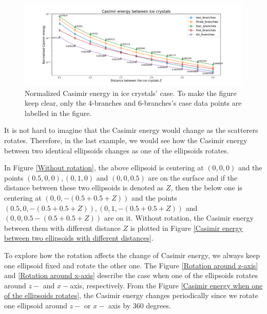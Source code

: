     \begin{figure}[H]
        \centering
        \hspace*{-1cm}\includegraphics[scale = 0.5]{figures/CasE_ice_crystals.pdf}
        \caption{Normalized Casimir energy in ice crystals' case. To make the figure keep clear, only the 4-branches and 6-branches's case data points 
        are labelled in the figure.}
        \label{Normalized Casimir energy in ice crystals' case}
    \end{figure}


It is not hard to imagine that the Casimir energy would change as the scatterers rotates. Therefore, in the last example, we would see how the Casimir energy 
between two identical ellipsoids changes as one of the ellipsoids rotates.

In Figure \ref{Without rotation}, the above ellipsoid is centering at $(0,0,0)$ and 
the points $(0.5, 0, 0), (0, 1, 0)$ and $(0, 0, 0.5)$ are on the surface and if the distance between these two ellipsoids is denoted as $Z$, then the below one
is centering at $(0, 0, -(0.5+0.5+Z))$ and the points $(0.5, 0, -(0.5+0.5+Z)), (0, 1, -(0.5+0.5+Z))$ and $(0, 0, 0.5-(0.5+0.5+Z))$ are on it. Without rotation, 
the Casimir energy between them with different distance $Z$ is plotted in Figure \ref{Casimir energy between two ellipsoids with different distances}.

To explore how the rotation affects the change of Casimir energy, we always keep one ellipsoid fixed and rotate the other one. The Figure 
\ref{Rotation around z-axis} and \ref{Rotation around x-axis} describe the case when one of the ellipsoids rotates around $z-$ and $x-$axis, respectively.
From the Figure \ref{Casimir energy when one of the ellipsoids rotates}, the Casimir energy changes periodically since we rotate one ellipsoid around 
$z-$ or $x-$ axis by 360 degrees. 


